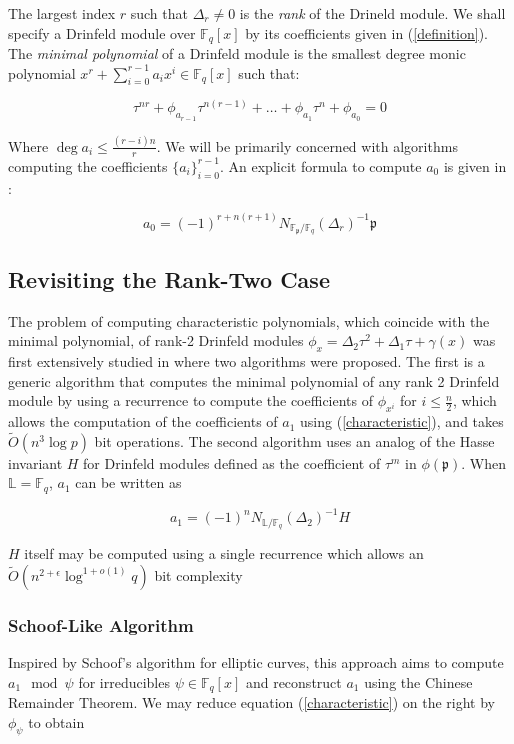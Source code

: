 \documentclass[sigconf]{acmart}
\newcommand{\F}{\mathbb{F}}
\renewcommand{\L}{\mathbb{L}}
\newcommand{\frakp}{\mathfrak{p}}
\begin{document}
The largest index $r$ such that $\Delta_r \neq 0$ is the \textit{rank} of the Drineld module. We shall specify a Drinfeld module over $\F_q[x]$ by its coefficients given in (\ref{definition}). The \textit{minimal polynomial} of a Drinfeld module is the smallest degree monic polynomial $x^r + \sum_{i=0}^{r - 1} a_ix^i \in \F_q[x]$ such that:

\begin{equation}\label{characteristic}
    \tau^{nr} + \phi_{a_{r-1}}\tau^{n(r-1)} + \ldots + \phi_{a_1} \tau^n + \phi_{a_0} = 0
\end{equation}

Where $\deg a_i \leq \frac{(r - i)n}{r}$. We will be primarily concerned with algorithms computing the coefficients $\{ a_i \}_{i=0}^{r-1}$. An explicit formula to compute $a_0$ is given in \cite{GaPa18}:

\begin{equation}\label{norm}
    a_0 = (-1)^{r + n(r+1)}N_{\F_{\mathfrak{p}}/\F_q}(\Delta_r)^{-1} \mathfrak{p}
\end{equation}

\subsection{Revisiting the Rank-Two Case}

The problem of computing characteristic polynomials, which coincide with the minimal polynomial, of rank-2 Drinfeld modules $\phi_x = \Delta_2 \tau^2 + \Delta_1 \tau + \gamma(x)$ was first extensively studied in \cite{gekeler} where two algorithms were proposed. The first is a generic algorithm that computes the minimal polynomial of any rank 2 Drinfeld module by using a recurrence to compute the coefficients of $\phi_{x^i}$ for $i \leq \frac{n}{2}$, which allows the computation of the coefficients of $a_1$ using (\ref{characteristic}), and takes $\tilde{O}(n^3 \log p)$ bit operations. The second algorithm uses an analog of the Hasse invariant $H$ for Drinfeld modules defined as the coefficient of $\tau^m$ in $\phi(\frakp)$. When $\L = \F_q$, $a_1$ can be written as

\begin{equation*}
    a_1 = (-1)^n N_{\L/\F_q}(\Delta_2)^{-1}H
\end{equation*}

$H$ itself may be computed using a single recurrence which allows an $\tilde{O}(n^{2 + \epsilon} \log^{1 + o(1)} q)$ bit complexity

\subsubsection{Schoof-Like Algorithm} Inspired by Schoof's algorithm for elliptic curves, this approach aims to compute $a_1 \mod \psi$ for irreducibles $\psi \in \F_q[x]$ and reconstruct $a_1$ using the Chinese Remainder Theorem. We may reduce equation (\ref{characteristic}) on the right by $\phi_{\psi}$ to obtain
\end{document}

